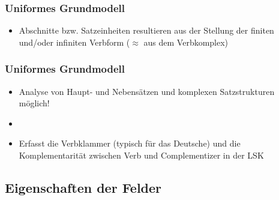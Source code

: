 \begin{frame}
\frametitle{Uniformes Grundmodell}

\begin{itemize}
	\item Abschnitte bzw. Satzeinheiten resultieren aus der Stellung der finiten und/oder infiniten Verbform ($\approx$ aus dem Verbkomplex)
\end{itemize}

\begin{table}
\centering
{}
\end{table}

\end{frame}


\begin{frame}
\frametitle{Uniformes Grundmodell}

\begin{itemize}
	\item Analyse von Haupt- und Nebensätzen und komplexen Satzstrukturen möglich!
	\item[]
	\item Erfasst die Verbklammer (typisch für das Deutsche) und
	die Komplementarität zwischen Verb und Complementizer in der LSK
\end{itemize}

\begin{table}
\centering
{}
\end{table}

\end{frame}


\subsection{Eigenschaften der Felder}


